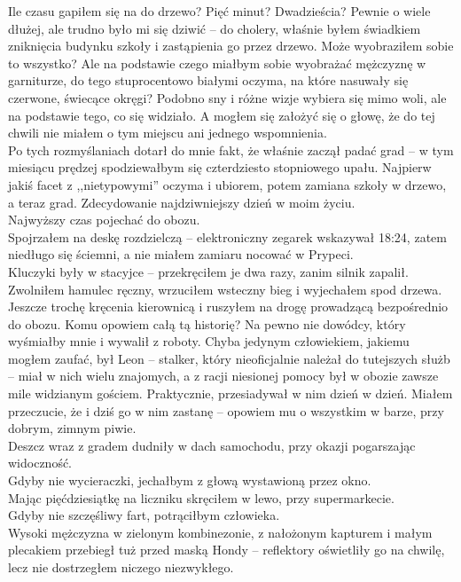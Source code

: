 \documentclass[../MAIN.tex]{subfiles}
\begin{document}
Ile czasu gapiłem się na do drzewo? Pięć minut? Dwadzieścia? Pewnie o wiele dłużej, ale trudno było mi się dziwić -- do cholery, właśnie byłem świadkiem zniknięcia budynku szkoły i zastąpienia go przez drzewo. Może wyobraziłem sobie to wszystko? Ale na podstawie czego miałbym sobie wyobrażać mężczyznę w garniturze, do tego stuprocentowo białymi oczyma, na które nasuwały się czerwone, świecące okręgi? Podobno sny i różne wizje wybiera się mimo woli, ale na podstawie tego, co się widziało. A mogłem się założyć się o głowę, że do tej chwili nie miałem o tym miejscu ani jednego wspomnienia. \\
Po tych rozmyślaniach dotarł do mnie fakt, że właśnie zaczął padać grad -- w tym miesiącu prędzej spodziewałbym się czterdziesto stopniowego upału. Najpierw jakiś facet z ,,nietypowymi'' oczyma i ubiorem, potem zamiana szkoły w drzewo, a teraz grad. Zdecydowanie najdziwniejszy dzień w moim życiu.\\
Najwyższy czas pojechać do obozu. \\
Spojrzałem na deskę rozdzielczą -- elektroniczny zegarek wskazywał 18:24, zatem niedługo się ściemni, a nie miałem zamiaru nocować w Prypeci. \\
Kluczyki były w stacyjce -- przekręciłem je dwa razy, zanim silnik zapalił. Zwolniłem hamulec ręczny, wrzuciłem wsteczny bieg i wyjechałem spod drzewa. Jeszcze trochę kręcenia kierownicą i ruszyłem na drogę prowadzącą bezpośrednio do obozu.
Komu opowiem całą tą historię? Na pewno nie dowódcy, który wyśmiałby mnie i wywalił z roboty. Chyba jedynym człowiekiem, jakiemu mogłem zaufać, był Leon -- stalker, który nieoficjalnie należał do tutejszych służb -- miał w nich wielu znajomych, a z racji niesionej pomocy był w obozie zawsze mile widzianym gościem. Praktycznie, przesiadywał w nim dzień w dzień. Miałem przeczucie, że i dziś go w nim zastanę -- opowiem mu o wszystkim w barze, przy dobrym, zimnym piwie. \\
Deszcz wraz z gradem dudniły w dach samochodu, przy okazji pogarszając widoczność. \\
Gdyby nie wycieraczki, jechałbym z głową wystawioną przez okno. \\
Mając pięćdziesiątkę na liczniku skręciłem w lewo, przy supermarkecie.\\
Gdyby nie szczęśliwy fart, potrąciłbym człowieka. \\
Wysoki mężczyzna w zielonym kombinezonie, z nałożonym kapturem i małym plecakiem przebiegł tuż przed maską Hondy -- reflektory oświetliły go na chwilę, lecz nie dostrzegłem niczego niezwykłego. \\
\end{document}

